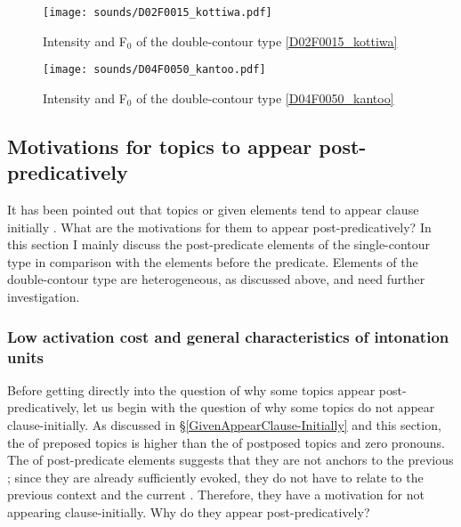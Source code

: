 \begin{figure}
	\begin{center}
	\texttt{[image: sounds/D02F0015\_kottiwa.pdf]}
	\caption{Intensity and F$_{0}$ of the double-contour type \ref{D02F0015_kottiwa}}
	\label{D02F0015_kottiwaF}
	\end{center}
\end{figure}
\begin{figure}
	\begin{center}
	\texttt{[image: sounds/D04F0050\_kantoo.pdf]}
	\caption{Intensity and F$_{0}$ of the double-contour type \ref{D04F0050_kantoo}}
	\label{D04F0050_kantooF}
	\end{center}
\end{figure}



\subsection{Motivations for topics to appear post-predicatively}\label{WO:PostP:Motivations}

It has been pointed out that
topics or given elements tend to appear clause initially \cite{mathesius28,firbas64,danes70}.
What are the motivations for them to appear post-predicatively?
In this section I mainly discuss the post-predicate elements of the single-contour type in comparison with the elements before the predicate.
Elements of the double-contour type are heterogeneous, as discussed above, and need further investigation.


\subsubsection{Low activation cost and general characteristics of intonation units}\label{WO:PostP:Motivations:IU}

Before getting directly into the question of
why some topics appear post-pred\-i\-cat\-ively, %
let us begin with the question of why some topics do not appear clause-initially.
As discussed in \S \ref{GivenAppearClause-Initially} and this section,
the  of preposed topics is higher than
the  of postposed topics and zero pronouns.
The  of post-predicate elements suggests that
they are not anchors to the previous ;
since they are already sufficiently evoked,
they do not have to relate to the previous context and the current .
Therefore, they have a motivation for not appearing clause-initially.
Why do they appear post-predicatively?

